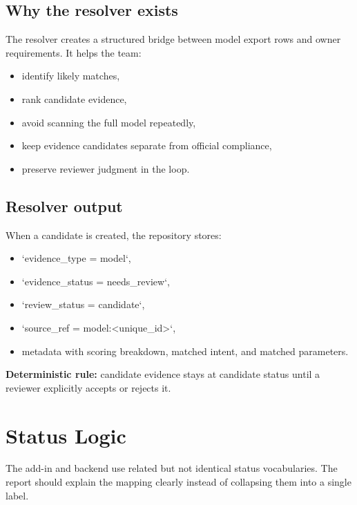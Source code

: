\documentclass[10pt,letterpaper]{article}
\newcommand{\strong}[1]{\textbf{\textcolor{emaNavy}{#1}}}
\newcommand{\keyconcept}[1]{%
\begin{tcolorbox}[colback=emaSoft,borderline west={3pt}{0pt}{emaBlue}]
\small #1
\end{tcolorbox}}
\begin{document}
\subsection{Why the resolver exists}

The resolver creates a structured bridge between model export rows and owner requirements. It helps the team:

\begin{itemize}
  \item identify likely matches,
  \item rank candidate evidence,
  \item avoid scanning the full model repeatedly,
  \item keep evidence candidates separate from official compliance,
  \item preserve reviewer judgment in the loop.
\end{itemize}

\subsection{Resolver output}

When a candidate is created, the repository stores:

\begin{itemize}
  \item `evidence_type = model`,
  \item `evidence_status = needs_review`,
  \item `review_status = candidate`,
  \item `source_ref = model:<unique_id>`,
  \item metadata with scoring breakdown, matched intent, and matched parameters.
\end{itemize}

\keyconcept{\strong{Deterministic rule:} candidate evidence stays at candidate status until a reviewer explicitly accepts or rejects it.}

\section{Status Logic}

The add-in and backend use related but not identical status vocabularies. The report should explain the mapping clearly instead of collapsing them into a single label.
\end{document}
